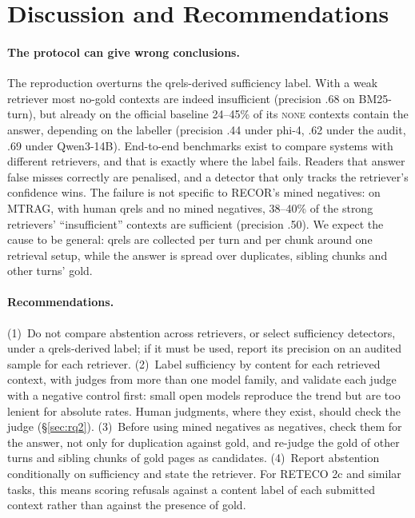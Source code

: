 \documentclass[11pt]{article}
\newcommand{\qnone}{\textnormal{\textsc{none}}}
\begin{document}
\section{Discussion and Recommendations}
\label{sec:discussion}

\paragraph{The protocol can give wrong conclusions.}
The reproduction overturns the qrels-derived sufficiency label. With a weak retriever most no-gold contexts are indeed insufficient (precision .68 on BM25-turn), but already on the official baseline 24--45\% of its \qnone{} contexts contain the answer, depending on the labeller (precision .44 under phi-4, .62 under the audit, .69 under Qwen3-14B). End-to-end benchmarks exist to compare systems with different retrievers, and that is exactly where the label fails. Readers that answer false misses correctly are penalised, and a detector that only tracks the retriever's confidence wins. The failure is not specific to RECOR's mined negatives: on MTRAG, with human qrels and no mined negatives, 38--40\% of the strong retrievers' ``insufficient'' contexts are sufficient (precision .50). We expect the cause to be general: qrels are collected per turn and per chunk around one retrieval setup, while the answer is spread over duplicates, sibling chunks and other turns' gold.

\paragraph{Recommendations.}
(1)~Do not compare abstention across retrievers, or select sufficiency detectors, under a qrels-derived label; if it must be used, report its precision on an audited sample for each retriever. (2)~Label sufficiency by content for each retrieved context, with judges from more than one model family, and validate each judge with a negative control first: small open models reproduce the trend but are too lenient for absolute rates. Human judgments, where they exist, should check the judge (\S\ref{sec:rq2}). (3)~Before using mined negatives as negatives, check them for the answer, not only for duplication against gold, and re-judge the gold of other turns and sibling chunks of gold pages as candidates. (4)~Report abstention conditionally on sufficiency and state the retriever. For RETECO 2c and similar tasks, this means scoring refusals against a content label of each submitted context rather than against the presence of gold.
\end{document}
